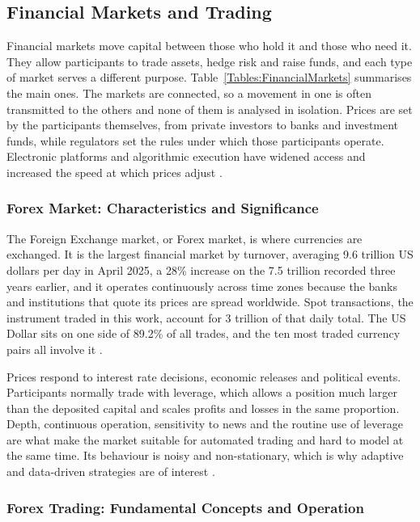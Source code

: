 \subsection{Financial Markets and Trading}

Financial markets move capital between those who hold it and those who need it. They allow participants to trade assets, hedge risk and raise funds, and each type of market serves a different purpose. Table~\ref{Tables:FinancialMarkets} summarises the main ones. The markets are connected, so a movement in one is often transmitted to the others and none of them is analysed in isolation. Prices are set by the participants themselves, from private investors to banks and investment funds, while regulators set the rules under which those participants operate. Electronic platforms and algorithmic execution have widened access and increased the speed at which prices adjust \cite{brandimarte_introduction_2018}.



\subsubsection{Forex Market: Characteristics and Significance}

The Foreign Exchange market, or Forex market, is where currencies are exchanged. It is the largest financial market by turnover, averaging 9.6 trillion US dollars per day in April 2025, a 28\% increase on the 7.5 trillion recorded three years earlier, and it operates continuously across time zones because the banks and institutions that quote its prices are spread worldwide. Spot transactions, the instrument traded in this work, account for 3 trillion of that daily total. The US Dollar sits on one side of 89.2\% of all trades, and the ten most traded currency pairs all involve it \cite{bis_otc_2025}.

Prices respond to interest rate decisions, economic releases and political events. Participants normally trade with leverage, which allows a position much larger than the deposited capital and scales profits and losses in the same proportion. Depth, continuous operation, sensitivity to news and the routine use of leverage are what make the market suitable for automated trading and hard to model at the same time. Its behaviour is noisy and non-stationary, which is why adaptive and data-driven strategies are of interest \cite{donnelly_art_2019}.

\subsubsection{Forex Trading: Fundamental Concepts and Operation}

